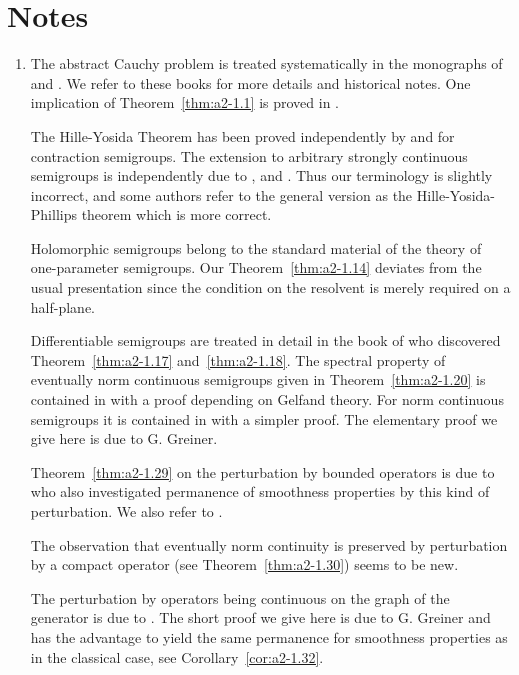 \section*{Notes}\label{notes:a2-notes}
\begin{enumerate}[label=\emph{Section \arabic*:}, wide, itemsep=1ex]
\item
The abstract Cauchy problem is treated systematically in the monographs of \textcite{krein:1971} and \textcite{fattorini:1983}.
We refer to these books for more details and historical notes.
One implication of Theorem~\ref{thm:a2-1.1}   is proved in \textcite[Theorem 2.11]{krein:1971}.

The Hille-Yosida Theorem has been proved independently by \textcite{hille:1948} and \textcite{yosida:1948} for contraction semigroups.
The extension to arbitrary strongly continuous semigroups is independently due to \textcite{feller:1953a}, \textcite{miyadera:1952} and \textcite{phillips:1954}.
Thus our terminology is slightly incorrect, and some authors refer to the general version as the Hille-Yosida-Phillips theorem which is  more correct.

Holomorphic semigroups belong to the standard material of the theory of one-parameter semigroups.
Our Theorem~\ref{thm:a2-1.14}   deviates from the usual presentation since the condition on the resolvent is merely required on a half-plane.

Differentiable semigroups are treated in detail in the book of \textcite{pazy:1983} who discovered Theorem~\ref{thm:a2-1.17}   and~\ref{thm:a2-1.18}. 
The spectral property of eventually norm continuous semigroups given in Theorem~\ref{thm:a2-1.20}   is contained in \textcite[Theorem 16.4.2]{hillephillips:1957} with a proof depending on Gelfand theory.
For norm continuous semigroups it is contained in \textcite{pazy:1983} with a simpler proof.
The elementary proof we give here is due to G. Greiner.

Theorem~\ref{thm:a2-1.29}   on the perturbation by bounded operators is due to \textcite{phillips:1954} who also investigated permanence of smoothness properties by this kind of perturbation.
We also refer to \textcite[Section 3.1]{pazy:1983}.

The observation that eventually norm continuity is preserved by perturbation by a compact operator (see Theorem~\ref{thm:a2-1.30}) seems to be new.

The perturbation by operators being continuous on the graph of the generator is due to \textcite{deschschappacher:1984}.
The short proof we give here is due to G. Greiner and has the advantage to yield the same permanence for smoothness properties as in the classical case, see Corollary~\ref{cor:a2-1.32}. 


\end{enumerate}
